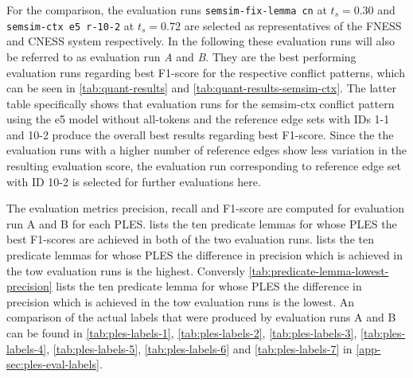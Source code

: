 \documentclass[11pt]{scrreprt}
\begin{document}
For the comparison, the evaluation runs \texttt{semsim-fix-lemma cn} at \(t_s = 0.30\) and \texttt{semsim-ctx e5 r-10-2} at \(t_s = 0.72\) are selected as representatives of the FNESS and CNESS system respectively. In the following these evaluation runs will also be referred to as evaluation run \textit{A} and \textit{B}. They are the best performing evaluation runs regarding best F1-score for the respective conflict patterns, which can be seen in \cref{tab:quant-results} and \cref{tab:quant-results-semsim-ctx}. The latter table specifically shows that evaluation runs for the semsim-ctx conflict pattern using the e5 model without all-tokens and the reference edge sets with IDs 1-1 and 10-2 produce the overall best results regarding best F1-score. Since the the evaluation runs with a higher number of reference edges show less variation in the resulting evaluation score, the evaluation run corresponding to reference edge set with ID 10-2 is selected for further evaluations here.

The evaluation metrics precision, recall and F1-score are computed for evaluation run A and B for each PLES.  lists the ten predicate lemmas for whose PLES the best F1-scores are achieved in both of the two evaluation runs.  lists the ten predicate lemmas for whose PLES the difference in precision which is achieved in the tow evaluation runs is the highest. Conversly \cref{tab:predicate-lemma-lowest-precision} lists the ten predicate lemma for whose PLES the difference in precision which is achieved in the tow evaluation runs is the lowest. An comparison of the actual labels that were produced by evaluation runs A and B can be found in \cref{tab:ples-labels-1}, \cref{tab:ples-labels-2}, \cref{tab:ples-labels-3}, \cref{tab:ples-labels-4}, \cref{tab:ples-labels-5}, \cref{tab:ples-labels-6} and \cref{tab:ples-labels-7} in \cref{app-sec:ples-eval-labels}.
\end{document}
